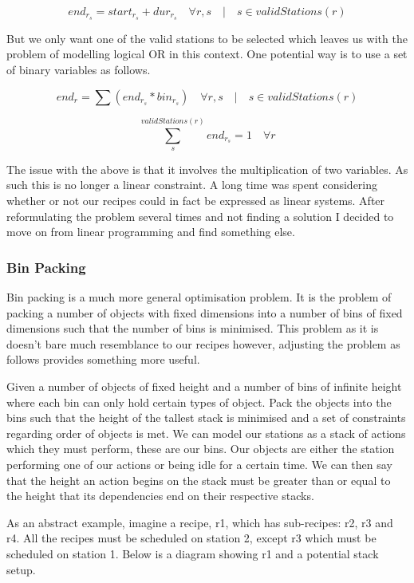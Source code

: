 \documentclass[11pt]{article}
\begin{document}
\[ end_{r_s} = start_{r_s} + dur_{r_s} \quad \forall r,s \quad | \quad s \in validStations(r) \]

But we only want one of the valid stations to be selected which leaves us with the problem
of modelling logical OR in this context. One potential way is to use a set of binary variables
as follows.

\[ end_r = \sum (end_{r_s} * bin_{r_s}) \quad \forall r,s \quad | \quad s \in validStations(r) \]

\[ \sum_{s}^{validStations(r)} end_{r_s} = 1 \quad \forall r \]

The issue with the above is that it involves the multiplication of two variables. As such this
is no longer a linear constraint. A long time was spent considering whether or not our recipes
could in fact be expressed as linear systems. After reformulating the problem several times
and not finding a solution I decided to move on from linear programming and find something else.

\subsubsection{Bin Packing}

Bin packing is a much more general optimisation problem. It is the problem of packing a number
of objects with fixed dimensions into a number of bins of fixed dimensions such that the number
of bins is minimised. This problem as it is doesn't bare much resemblance to our recipes however,
adjusting the problem as follows provides something more useful.

\medbreak

Given a number of objects of fixed height and a number of bins of infinite height where each
bin can only hold certain types of object. Pack the objects into the bins such that the
height of the tallest stack is minimised and a set of constraints regarding order of
objects is met. We can model our stations as a stack of actions which they must perform,
these are our bins. Our objects are either the station performing one of our actions
or being idle for a certain time. We can then say that the height an action begins on
the stack must be greater than or equal to the height that its dependencies end on their
respective stacks.

\medbreak

As an abstract example, imagine a recipe, r1, which has sub-recipes: r2, r3 and r4. All the
recipes must be scheduled on station 2, except r3 which must be scheduled on station 1.
Below is a diagram showing r1 and a potential stack setup.
\end{document}
